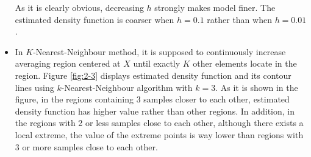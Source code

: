 \documentclass[12pt]{article}
\begin{document}
\begin{itemize}
As it is clearly obvious, decreasing $h$ strongly makes model finer. The estimated density function is coarser when $h = 0.1$ rather than when $h = 0.01$.

\item In $K$-Nearest-Neighbour method, it is supposed to continuously increase averaging region centered at $X$ until exactly $K$ other elements locate in the region. Figure \ref{fig:2-3} displays estimated density function and its contour lines using $k$-Nearest-Neighbour algorithm with $k = 3$. As it is shown in the figure, in the regions containing 3 samples closer to each other, estimated density function has higher value rather than other regions. In addition, in the regions with 2 or less samples close to each other, although there exists a local extreme, the value of the extreme points is way lower than regions with 3 or more samples close to each other.


\end{itemize}
\end{document}
